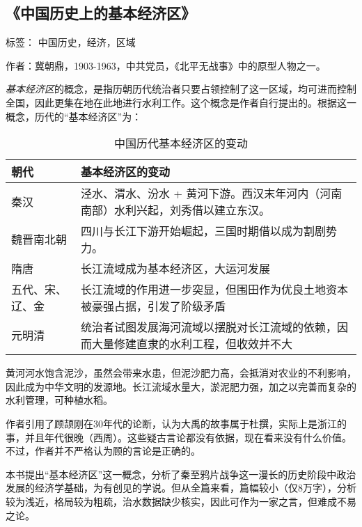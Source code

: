 \subsection{《中国历史上的基本经济区》}

标签： 中国历史，经济，区域


作者：冀朝鼎，1903-1963，中共党员，《北平无战事》中的原型人物之一。

\emph{基本经济区}的概念，是指历朝历代统治者只要占领控制了这一区域，均可进而控制全国，因此更集在地在此地进行水利工作。这个概念是作者自行提出的。根据这一概念，历代的“基本经济区”为：

\begin{table}[htpb]
\centering
\caption{中国历代基本经济区的变动}
\begin{tabular}{l|p{}}
朝代 & 基本经济区的变动 \\
\hline
秦汉 & 泾水、渭水、汾水 + 黄河下游。西汉末年河内（河南南部）水利兴起，刘秀借以建立东汉。\\
魏晋南北朝 & 四川与长江下游开始崛起，三国时期借以成为割剧势力。\\
隋唐 & 长江流域成为基本经济区，大运河发展\\
五代、宋、辽、金 & 长江流域的作用进一步突显，但围田作为优良土地资本被豪强占据，引发了阶级矛盾\\
元明清 & 统治者试图发展海河流域以摆脱对长江流域的依赖，因而大量修建直隶的水利工程，但收效并不大\\
\end{tabular}
\end{table}

黄河河水饱含泥沙，虽然会带来水患，但泥沙肥力高，会抵消对农业的不利影响，因此成为中华文明的发源地。长江流域水量大，淤泥肥力强，加之以完善而复杂的水利管理，可种植水稻。

作者引用了顾颉刚在30年代的论断，认为大禹的故事属于杜撰，实际上是浙江的事，并且年代很晚（西周）。这些疑古言论都没有依据，现在看来没有什么价值。不过，作者并不严格认为顾的言论是正确的。

本书提出“基本经济区”这一概念，分析了秦至鸦片战争这一漫长的历史阶段中政治发展的经济学基础，为有创见的学说。但从全篇来看，篇幅较小（仅8万字），分析较为浅近，格局较为粗疏，治水数据缺少核实，因此可作为一家之言，但难成不易之论。